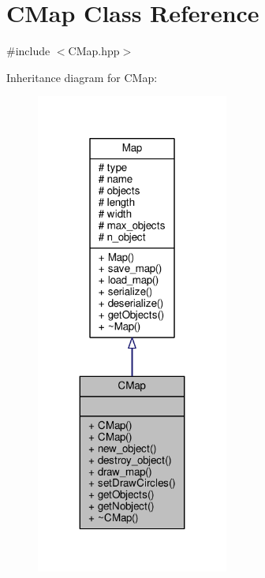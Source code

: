 \hypertarget{class_c_map}{}\section{C\+Map Class Reference}
\label{class_c_map}


{\ttfamily \#include $<$C\+Map.\+hpp$>$}



Inheritance diagram for C\+Map\+:\nopagebreak
\begin{figure}[H]
\begin{center}
\leavevmode
\includegraphics[width=179pt]{class_c_map__inherit__graph}
\end{center}
\end{figure}


